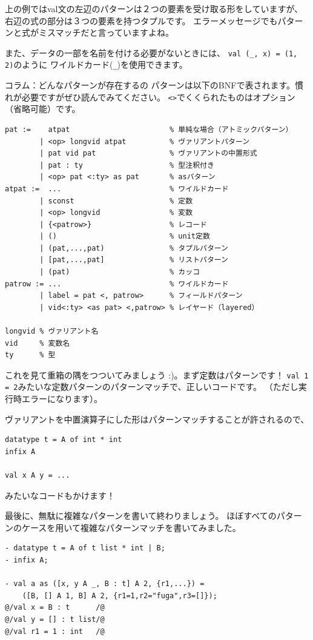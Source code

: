 \documentclass[11pt,a4paper]{article}
\begin{document}
上の例ではval文の左辺のパターンは２つの要素を受け取る形をしていますが、
右辺の式の部分は３つの要素を持つタプルです。
エラーメッセージでもパターンと式がミスマッチだと言っていますよね。

また、データの一部を名前を付ける必要がないときには、
\lstinline{val (_, x) = (1, 2)}のように
ワイルドカード(\lstinline{_})を使用できます。

\begin{itembox}[l]{コラム：どんなパターンが存在するの}
  パターンは以下のBNFで表されます。慣れが必要ですがぜひ読んでみてください。
  \lstinline{<>}でくくられたものはオプション（省略可能）です。
\begin{Verbatim}
pat :=    atpat                       % 単純な場合（アトミックパターン）
        | <op> longvid atpat          % ヴァリアントパターン
        | pat vid pat                 % ヴァリアントの中置形式
        | pat : ty                    % 型注釈付き
        | <op> pat <:ty> as pat       % asパターン
atpat :=  ...                         % ワイルドカード
        | sconst                      % 定数
        | <op> longvid                % 変数
        | {<patrow>}                  % レコード
        | ()                          % unit定数
        | (pat,...,pat)               % タプルパターン
        | [pat,...,pat]               % リストパターン
        | (pat)                       % カッコ
patrow := ...                         % ワイルドカード
        | label = pat <, patrow>      % フィールドパターン
        | vid<:ty> <as pat> <,patrow> % レイヤード（layered）

longvid % ヴァリアント名
vid     % 変数名
ty      % 型
\end{Verbatim}

これを見て重箱の隅をつついてみましょう :)。まず定数はパターンです！
\lstinline{val 1 = 2}みたいな定数パターンのパターンマッチで、正しいコードです。
（ただし実行時エラーになります）。

ヴァリアントを中置演算子にした形はパターンマッチすることが許されるので、
\begin{lstlisting}[caption=中置形式のヴァリアントのパターンマッチ]
datatype t = A of int * int
infix A

val x A y = ...
\end{lstlisting}
みたいなコードもかけます！

最後に、無駄に複雑なパターンを書いて終わりましょう。
ほぼすべてのパターンのケースを用いて複雑なパターンマッチを書いてみました。
\begin{lstlisting}[caption=複雑なパターン]
- datatype t = A of t list * int | B;
- infix A;

- val a as ([x, y A _, B : t] A 2, {r1,...}) =
    ([B, [] A 1, B] A 2, {r1=1,r2="fuga",r3=[]});
@/val x = B : t      /@
@/val y = [] : t list/@
@/val r1 = 1 : int   /@

\end{lstlisting}
\end{itembox}
\end{document}
